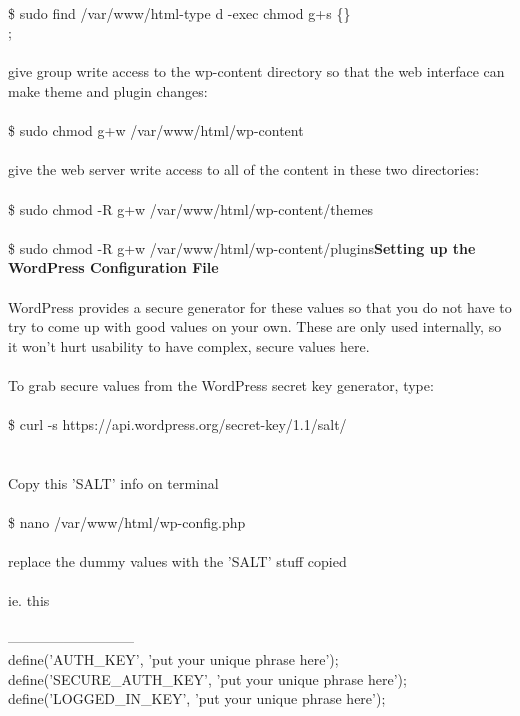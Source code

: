 \documentclass[10pt,a4paper]{article}
\begin{document}
{{{{{{{{{{{{{{{{\\
\$ sudo find /var/www/html}{\large  -type d -exec chmod g+s \{\} \\;\\
\\
give group write access to the wp-content directory so that the web interface can make theme and plugin changes:\\
\\
\$ sudo chmod g+w /var/www/html/wp-content}{\large \\
\\
give the web server write access to all of the content in these two directories:\\
\\
\$ sudo chmod -R g+w /var/www/html/wp-content/themes}{\large \\
\\
\$ sudo chmod -R g+w /var/www/html/wp-content/plugins}{\large \textbf{Setting up the WordPress Configuration File}}{\large \\
\\
 WordPress provides a secure generator for these values so that you do not have to try to come up with good values on your own. These are only used internally, so it won't hurt usability to have complex, secure values here.\\
\\
To grab secure values from the WordPress secret key generator, type:\\
\\
\$ curl -s https://api.wordpress.org/secret-key/1.1/salt/}{\large \\
\\
\\
Copy this 'SALT' info on terminal\\
\\
\$ nano /var/www/html/wp-config.php}{\large \\
\\
replace the dummy values with the 'SALT' stuff copied\\
\\
ie. this\\
\\
---------------------------\\
define('AUTH\_KEY',         'put your unique phrase here');\\
define('SECURE\_AUTH\_KEY',  'put your unique phrase here');\\
define('LOGGED\_IN\_KEY',    'put your unique phrase here');\\
}}}}}}}}}}}}}}}}
\end{document}
